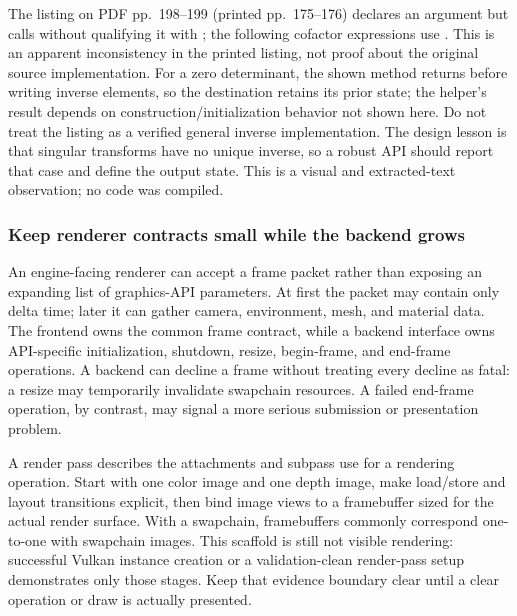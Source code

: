 The  listing on PDF pp.~198--199 (printed pp.~175--176) declares an argument  but calls  without qualifying it with ; the following cofactor expressions use . This is an apparent inconsistency in the printed listing, not proof about the original source implementation. For a zero determinant, the shown method returns before writing inverse elements, so the destination retains its prior state; the  helper's result depends on construction/initialization behavior not shown here. Do not treat the listing as a verified general inverse implementation. The design lesson is that singular transforms have no unique inverse, so a robust API should report that case and define the output state. This is a visual and extracted-text observation; no code was compiled.

\subsubsection{Keep renderer contracts small while the backend grows}\label{06-engine-ii-ch025-keep-renderer-contracts-small-while-the-backend-grows}

\hypertarget{06-engine-ii-ch025-keep-renderer-contracts-small-while-the-backend-grows}{}

An engine-facing renderer can accept a frame packet rather than exposing an expanding list of graphics-API parameters. At first the packet may contain only delta time; later it can gather camera, environment, mesh, and material data. The frontend owns the common frame contract, while a backend interface owns API-specific initialization, shutdown, resize, begin-frame, and end-frame operations. A backend can decline a frame without treating every decline as fatal: a resize may temporarily invalidate swapchain resources. A failed end-frame operation, by contrast, may signal a more serious submission or presentation problem.

A render pass describes the attachments and subpass use for a rendering operation. Start with one color image and one depth image, make load/store and layout transitions explicit, then bind image views to a framebuffer sized for the actual render surface. With a swapchain, framebuffers commonly correspond one-to-one with swapchain images. This scaffold is still not visible rendering: successful Vulkan instance creation or a validation-clean render-pass setup demonstrates only those stages. Keep that evidence boundary clear until a clear operation or draw is actually presented.


